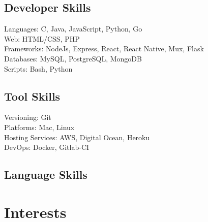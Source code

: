 \documentclass[a4paper]{deedy-resume} %
\begin{document}
\begin{minipage}[t]{0.55\textwidth}

\subsection{Developer Skills}

\textbullet{} Languages: C, Java, JavaScript, Python, Go  \\
\textbullet{} Web: HTML/CSS, PHP \\
\textbullet{} Frameworks: NodeJs, Express, React, React Native, Mux, Flask \\ 
\textbullet{} Databases: MySQL, PostgreSQL, MongoDB \\
\textbullet{} Scripts: Bash, Python

\end{minipage}
\begin{minipage}[t]{0.39\textwidth}

\subsection{Tool Skills}

\textbullet{} Versioning: Git \\
\textbullet{} Platforms: Mac, Linux \\
\textbullet{} Hosting Services: AWS, Digital Ocean, Heroku \\
\textbullet{} DevOps: Docker, Gitlab-CI 

\end{minipage}

\begin{minipage}[t]{0.29\textwidth}

\insectionspace 
\sectionspace
\subsection{Language Skills}


\end{minipage}

\sectionspace %



\section{Interests}
\end{document}
